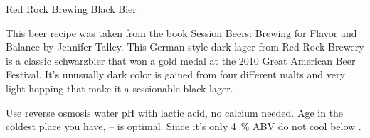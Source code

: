 \stylesection{\styleschwarzbier}

\begin{recipie}{Red Rock Brewing Black Bier}

\begin{aboutblock}
This beer recipe was taken from the book Session Beers: Brewing for Flavor and
Balance by Jennifer Talley. This German-style dark lager from Red Rock Brewery
is a classic schwarzbier that won a gold medal at the 2010 Great American Beer
Festival. It's unusually dark color is gained from four different malts and very
light hopping that make it a sessionable black lager. \sourceaha
\end{aboutblock}


\begin{methodandtiming}
 
\begin{mashsteps}
\end{mashsteps}

\begin{fermentationsteps}
\end{fermentationsteps}

\begin{directions}
Use reverse osmosis water pH with lactic acid, no calcium needed.
Age in the coldest place you have, -- is optimal. Since it's
only 4~\% ABV do not cool below .
\end{directions}

\end{methodandtiming}

\pagebreak

\begin{ingredientsblock}

\begin{malts}
\end{malts}

\begin{hops}
\end{hops}

\begin{yeasts}
\end{yeasts}

\end{ingredientsblock}

\end{recipie}
